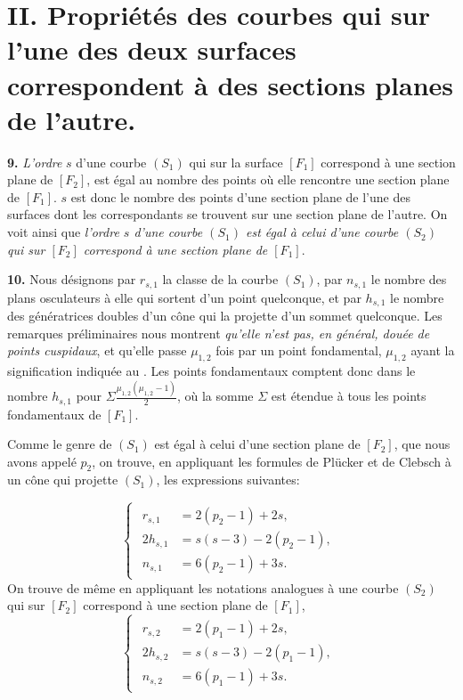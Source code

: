 \documentclass{article}
\begin{document}
\section*{II. Propriétés des courbes qui sur l'une des deux surfaces correspondent à des sections planes de l'autre.}

\textbf{9.} \emph{L'ordre} $s$ d'une courbe $(S_1)$ qui sur la surface $[F_1]$ correspond à une section plane de $[F_2]$, est égal au nombre des points où elle rencontre une section plane de $[F_1]$. $s$ est donc le nombre des points d'une section plane de l'une des surfaces dont les correspondants se trouvent sur une section plane de l'autre. On voit ainsi que \emph{l'ordre $s$ d'une courbe $(S_1)$ est égal à celui d'une courbe $(S_2)$ qui sur $[F_2]$ correspond à une section plane de $[F_1]$}.

\textbf{10.} Nous désignons par $r_{s, 1}$ la classe de la courbe $(S_1)$, par $n_{s, 1}$ le nombre des plans osculateurs à elle qui sortent d'un point quelconque, et par $h_{s, 1}$ le nombre des génératrices doubles d'un cône qui la projette d'un sommet quelconque. Les remarques préliminaires nous montrent \emph{qu'elle n'est pas, en général, douée de points cuspidaux}, et qu'elle passe $\mu_{1, 2}$ fois par un point fondamental, $\mu_{1, 2}$ ayant la signification indiquée au . Les points fondamentaux comptent donc dans le nombre $h_{s, 1}$ pour $\Sigma \frac{\mu_{1, 2}(\mu_{1, 2} - 1)}{2}$, où la somme $\Sigma$ est étendue à tous les points fondamentaux de $[F_1]$.

Comme le genre de $(S_1)$ est égal à celui d'une section plane de $[F_2]$, que nous avons appelé $p_2$, on trouve, en appliquant les formules de Plücker et de Clebsch à un cône qui projette $(S_1)$, les expressions suivantes:

\[
\begin{cases}
\begin{aligned}
r_{s, 1} &= 2(p_2 - 1) + 2s, \\
2h_{s, 1} &= s(s - 3) - 2(p_2 - 1), \\
n_{s, 1} &= 6(p_2 - 1) + 3s.
\end{aligned}
\end{cases} \tag{$3_a$}
\]
On trouve de même en appliquant les notations analogues à une courbe $(S_2)$ qui sur $[F_2]$ correspond à une section plane de $[F_1]$,
\[
\begin{cases}
\begin{aligned}
r_{s, 2} &= 2(p_1 - 1) + 2s, \\
2h_{s, 2} &= s(s - 3) - 2(p_1 - 1), \\
n_{s, 2} &= 6(p_1 - 1) + 3s.
\end{aligned}
\end{cases} \tag{$3_b$}
\]
\end{document}
